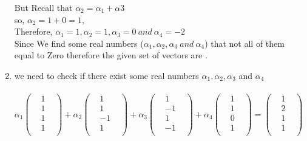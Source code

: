 \documentclass[45pt]{article}
\begin{document}
\begin{enumerate}
But Recall that $\alpha_2=\alpha_1+\alpha3$\\
so, $\alpha_2= 1+0 = 1,$ \\
Therefore, $\alpha_1=1, \alpha_2=1, \alpha_3=0~ and ~\alpha_4=-2$\\
Since We find some real numbers ($\alpha_1, \alpha_2, \alpha_3~and ~\alpha_4$) that not all of them equal to Zero therefore the given set of vectors are .\\


\item we need to check if there exist some real numbers $\alpha_1,\alpha_2,\alpha_3$ and $\alpha_4$\\\\
$\alpha_1 \begin{pmatrix}
  &1&\\&1&\\ &1&\\&1&\\
\end{pmatrix} +
\alpha_2\begin{pmatrix}
  &1&\\&1&\\ &-1&\\&1&\\
\end{pmatrix}+
\alpha_3 \begin{pmatrix}
  &1&\\&-1&\\ &1&\\&-1&\\
\end{pmatrix}+
\alpha_4 \begin{pmatrix}
  &1&\\&1&\\ &0&\\&1&\\
\end{pmatrix} = \begin{pmatrix}
  &1&\\&2&\\ &1&\\&1&\\
\end{pmatrix}$\\\\


\end{enumerate}
\end{document}
